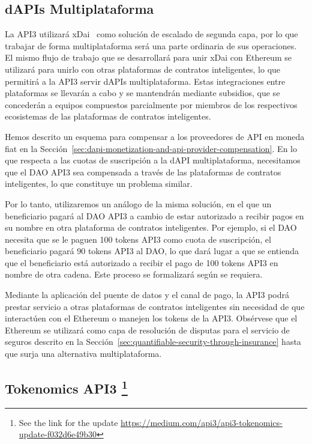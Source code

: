 \documentclass[11pt]{article}
\begin{document}
\subsection{dAPIs Multiplataforma}
\label{sec:cross-platform-dapis}

La API3 utilizará xDai~\cite{xdai:2019} como solución de escalado de segunda capa, por lo que trabajar de forma multiplataforma será una parte ordinaria de sus operaciones. El mismo flujo de trabajo que se desarrollará para unir xDai con Ethereum se utilizará para unirlo con otras plataformas de contratos inteligentes, lo que permitirá a la API3 servir dAPIs multiplataforma. Estas integraciones entre plataformas se llevarán a cabo y se mantendrán mediante subsidios, que se concederán a equipos compuestos parcialmente por miembros de los respectivos ecosistemas de las plataformas de contratos inteligentes.

Hemos descrito un esquema para compensar a los proveedores de API en moneda fiat en la Sección~\ref{sec:dapi-monetization-and-api-provider-compensation}.
En lo que respecta a las cuotas de suscripción a la dAPI multiplataforma, necesitamos que el DAO API3 sea compensada a través de las plataformas de contratos inteligentes, lo que constituye un problema similar.
 
Por lo tanto, utilizaremos un análogo de la misma solución, en el que un beneficiario pagará al DAO API3 a cambio de estar autorizado a recibir pagos en su nombre en otra plataforma de contratos inteligentes. Por ejemplo, si el DAO necesita que se le paguen 100 tokens API3 como cuota de suscripción, el beneficiario pagará 90 tokens API3 al DAO, lo que dará lugar a que se entienda que el beneficiario está autorizado a recibir el pago de 100 tokens API3 en nombre de otra cadena. Este proceso se formalizará según se requiera.

Mediante la aplicación del puente de datos y el canal de pago, la API3 podrá prestar servicio a otras plataformas de contratos inteligentes sin necesidad de que interactúen con el Ethereum o manejen los tokens de la API3. Obsérvese que el Ethereum se utilizará como capa de resolución de disputas para el servicio de seguros descrito en la Sección~\ref{sec:quantifiable-security-through-insurance} hasta que surja una alternativa multiplataforma.

\subsection{Tokenomics API3 \footnote{See the link for the update \url{https://medium.com/api3/api3-tokenomics-update-f032d6e49b30}}}
\label{sec:api3-tokenomics}
\end{document}
